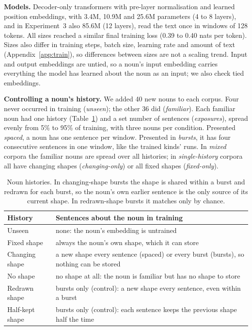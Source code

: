 \documentclass{article}
\begin{document}
\textbf{Models.} Decoder-only transformers with pre-layer normalisation and learned position embeddings, with 3.4M, 10.9M and 25.6M parameters (4 to 8 layers), and in Experiment~3 also 85.6M (12 layers), read the text once in windows of 128 tokens. All sizes reached a similar final training loss (0.39 to 0.40 nats per token). Sizes also differ in training steps, batch size, learning rate and amount of text (Appendix~\ref{app:train}), so differences between sizes are not a scaling trend. Input and output embeddings are untied, so a noun's input embedding carries everything the model has learned about the noun as an input; we also check tied embeddings.

\textbf{Controlling a noun's history.} We added 40 new nouns to each corpus. Four never occurred in training (\emph{unseen}); the other 36 did (\emph{familiar}). Each familiar noun had one history (Table~\ref{tab:design}) and a set number of sentences (\emph{exposures}), spread evenly from 5\% to 95\% of training, with three nouns per condition. Presented \emph{spaced}, a noun has one sentence per window. Presented in \emph{bursts}, it has four consecutive sentences in one window, like the trained kinds' runs. In \emph{mixed} corpora the familiar nouns are spread over all histories; in \emph{single-history} corpora all have changing shapes (\emph{changing-only}) or all fixed shapes (\emph{fixed-only}).

\begin{table}[t]
\centering
\small
\setlength{\tabcolsep}{3pt}
\begin{tabular}{@{}p{}p{}@{}}
\toprule
History & Sentences about the noun in training \\
\midrule
Unseen & none: the noun's embedding is untrained \\
Fixed shape & always the noun's own shape, which it can store \\
Changing shape & a new shape every sentence (spaced) or every burst (bursts), so nothing can be stored \\
No shape & no shape at all: the noun is familiar but has no shape to store \\
Redrawn shape & bursts only (control): a new shape every sentence, even within a burst \\
Half-kept shape & bursts only (control): each sentence keeps the previous shape half the time \\
\bottomrule
\end{tabular}
\caption{Noun histories. In changing-shape bursts the shape is shared within a burst and redrawn for each burst, so the noun's own earlier sentence is the only source of its current shape. In redrawn-shape bursts it matches only by chance.}
\label{tab:design}
\end{table}
\end{document}
